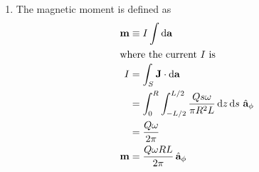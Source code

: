 \documentclass{homework}
\begin{document}
\begin{enumerate}
		\item The magnetic moment is defined as \begin{align*}
			\boldsymbol{\mathrm{m}} & \equiv I \int \dd{ \boldsymbol{\mathrm{a}} } \\
			\intertext{where the current $I$ is }
			I & = \int_S \boldsymbol{\mathrm{J}} \cdot \dd{ \boldsymbol{\mathrm{a}} } \\
				& = \int_0^R \int_{-L/2}^{L/2} \frac{Q s \omega}{\pi R^2 L}   \dd{z} \dd{s} \thinspace\hat{ \mathbf{a}}_{\phi} \\
				& = \frac{Q\omega}{2 \pi}\\
			\boldsymbol{\mathrm{m}} & = \frac{Q \omega R L}{2 \pi} \thinspace\hat{ \mathbf{a}}_{\phi}
		\end{align*}
	\end{enumerate}
\end{document}
